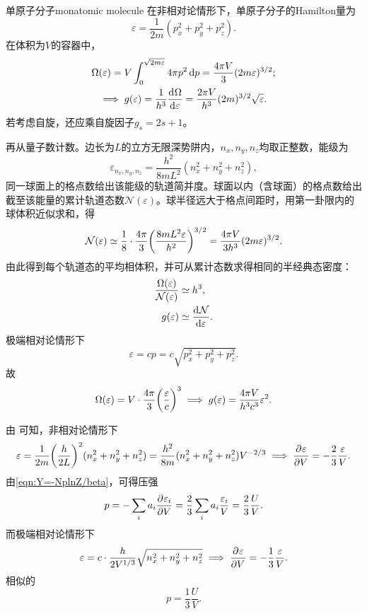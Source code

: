 \begin{example}{单原子分子}{monatomic molecule}
	在非相对论情形下，单原子分子的Hamilton量为
	\[
		\varepsilon = \frac1{2m}(p_x^2 + p_y^2 + p_z^2).
	\]
	在体积为$V$的容器中，
	\begin{gather}\notag
		\Omega(\varepsilon) = V\int_0^{\sqrt{2m\varepsilon}}4\pi p^2\mathop{}\!\mathrm{d} p = \frac{4\pi V}3(2m\varepsilon)^{3/2};\\
		\implies
		g(\varepsilon) = \frac1{h^3}\frac{\mathop{}\!\mathrm{d}^{}\Omega}{\mathrm{d}{\varepsilon}^{}} = \frac{2\pi V}{h^3}(2m)^{3/2}\sqrt\varepsilon.
	\end{gather}
	若考虑自旋，还应乘自旋因子$g_s = 2s + 1$。

	再从量子数计数。边长为$L$的立方无限深势阱内，$n_x,n_y,n_z$均取正整数，能级为
	\begin{equation}
		\label{eq:sm-cubic-box-spectrum}
		\varepsilon_{n_x,n_y,n_z} = \frac{h^2}{8mL^2}(n_x^2 + n_y^2 + n_z^2),
	\end{equation}
	同一球面上的格点数给出该能级的轨道简并度。球面以内（含球面）的格点数给出截至该能量的累计轨道态数$\mathcal N(\varepsilon)$。球半径远大于格点间距时，用第一卦限内的球体积近似求和，得
	\[
		\mathcal N(\varepsilon) \simeq \frac18 \cdot \frac{4\pi}3\biggl(\frac{8mL^2\varepsilon}{h^2}\biggr)^{3/2} = \frac{4\pi V}{3h^3}(2m\varepsilon)^{3/2}.
	\]
	由此得到每个轨道态的平均相体积，并可从累计态数求得相同的半经典态密度：
	\begin{align*}
		\frac{\Omega(\varepsilon)}{\mathcal N(\varepsilon)} &\simeq h^3,\\
		g(\varepsilon) &\simeq \frac{\mathop{}\!\mathrm{d}^{}\mathcal N}{\mathrm{d}{\varepsilon}^{}}.
	\end{align*}
	\tcblower
	极端相对论情形下
	\[
		\varepsilon = cp = c\sqrt{p_x^2 + p_y^2 + p_z^2}.
	\]
	故
	\begin{equation}
		\Omega(\varepsilon) = V \cdot \frac{4\pi}3\biggl(\frac\varepsilon{c}\biggr)^3
		\implies
		g(\varepsilon) = \frac{4\pi V}{h^3c^3}\varepsilon^2.
	\end{equation}
\end{example}
\begin{corollary}
	由 可知，非相对论情形下
	\[
		\varepsilon = \frac1{2m}\biggl(\frac h{2L}\biggr)^2(n_x^2 + n_y^2 + n_z^2) = \frac{h^2}{8m}(n_x^2 + n_y^2 + n_z^2)V^{-2/3}
		\implies
		\frac{\partial^{}\varepsilon}{\partial{V}^{}} = -\frac23\frac\varepsilon V.
	\]
	由\eqref{eqn:Y=-NplnZ/beta}，可得压强
	\begin{equation}
		p = -\sum_i a_i\frac{\partial^{}\varepsilon_i}{\partial{V}^{}} = \frac23\sum_i a_i\frac{\varepsilon_i}V = \frac23\frac UV.
	\end{equation}
	而极端相对论情形下
	\[
		\varepsilon = c \cdot \frac h{2V^{1/3}}\sqrt{n_x^2 + n_y^2 + n_z^2}
		\implies
		\frac{\partial^{}\varepsilon}{\partial{V}^{}} = -\frac13\frac\varepsilon V.
	\]
	相似的
	\begin{equation}
		p = \frac13\frac UV.
	\end{equation}
\end{corollary}
